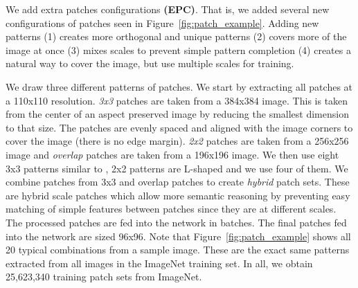 \documentclass[10pt,twocolumn,letterpaper]{article}
\begin{document}
We add extra patches configurations {\bf (EPC)}. That is, we added several new configurations of patches seen in Figure~\ref{fig:patch_example}. Adding new patterns (1) creates more orthogonal and unique patterns (2) covers more of the image at once (3) mixes scales to prevent simple pattern completion (4) creates a natural way to cover the image, but use multiple scales for training.

We draw three different patterns of patches. We start by extracting all patches at a 110x110 resolution. \emph{3x3} patches are taken from a 384x384 image. This is taken from the center of an aspect preserved image by reducing the smallest dimension to that size. The patches are evenly spaced and aligned with the image corners to cover the image (there is no edge margin). \emph{2x2} patches are taken from a 256x256 image and \emph{overlap} patches are taken from a 196x196 image. We then use eight 3x3 patterns similar to \cite{Doersch15}, 2x2 patterns are L-shaped and we use four of them. We combine patches from 3x3 and overlap patches to create \emph{hybrid} patch sets. These are hybrid scale patches which allow more semantic reasoning by preventing easy matching of simple features between patches since they are at different scales. The processed patches are fed into the network in batches. The final patches fed into the network are sized 96x96. Note that Figure~\ref{fig:patch_example} shows all 20 typical combinations from a sample image. These are the exact same patterns extracted from all images in the ImageNet training set. In all, we obtain 25,623,340 training patch sets from ImageNet. 

\end{document}
